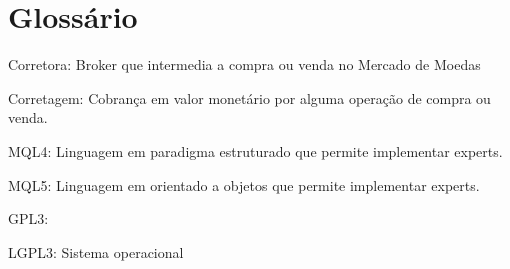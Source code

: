 \chapter{Glossário}

Corretora: Broker que intermedia a compra ou venda no Mercado de Moedas

Corretagem: Cobrança em valor monetário por alguma operação de compra ou venda.

MQL4: Linguagem em paradigma estruturado que permite implementar experts.

MQL5: Linguagem em orientado a objetos que permite implementar experts.

GPL3:

LGPL3: Sistema operacional

